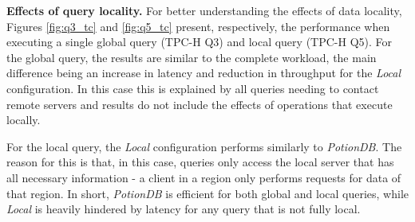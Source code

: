 \documentclass[sigplan,twocolumn,review,anonymous]{acmart}
\begin{document}
\noindent
\textbf{Effects of query locality.}
For better understanding the effects of data locality,  Figures \ref{fig:q3_tc} and \ref{fig:q5_tc} present, respectively, the performance when
executing a single global query (TPC-H Q3) and local query (TPC-H Q5). 
For the global query, the results are similar to the complete workload, the main difference being an increase in latency and reduction in  throughput for the \textit{Local} configuration. In this case this is explained by all queries needing to contact remote servers and results do not include the effects of operations that execute locally.

For the local query, the \textit{Local} configuration performs similarly to \textit{PotionDB}. The reason for this is that, in this case, queries only access the local server that has all necessary information - a client in a region only performs requests for data of that region.
In short, \textit{PotionDB} is efficient for both global and local queries, while \textit{Local} is heavily hindered by latency for any query that is not fully local.

%
%
%
\end{document}
